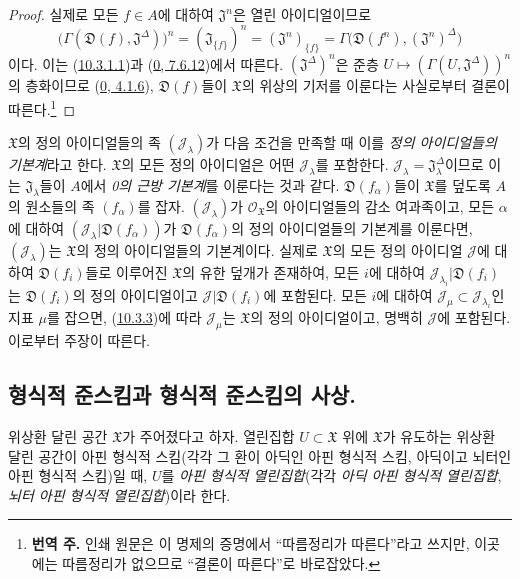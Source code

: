 \begin{proof}
실제로 모든 $f\in A$에 대하여 $\mathfrak{J}^n$은 열린 아이디얼이므로
\[
  \bigl(\Gamma(\mathfrak{D}(f),\mathfrak{J}^\Delta)\bigr)^n
  =(\mathfrak{J}_{\{f\}})^n
  =(\mathfrak{J}^n)_{\{f\}}
  =\Gamma\bigl(\mathfrak{D}(f^n),(\mathfrak{J}^n)^\Delta\bigr)
\]
이다. 이는 (\hyperref[I.10.3.1.1-ko]{10.3.1.1})과
(\hyperref[0.7.6.12-ko]{0, 7.6.12})에서 따른다.
$(\mathfrak{J}^\Delta)^n$은 준층
$U\mapsto(\Gamma(U,\mathfrak{J}^\Delta))^n$의 층화이므로
(\hyperref[0.4.1.6-ko]{0, 4.1.6}), $\mathfrak{D}(f)$들이
$\mathfrak{X}$의 위상의 기저를 이룬다는 사실로부터 결론이
따른다.\footnote{\textbf{번역 주.} 인쇄 원문은 이 명제의 증명에서
“따름정리가 따른다”라고 쓰지만, 이곳에는 따름정리가 없으므로 “결론이
따른다”로 바로잡았다.}
\end{proof}

\begin{env}[10.3.7]
\label{I.10.3.7-ko}
$\mathfrak{X}$의 정의 아이디얼들의 족 $(\mathscr{J}_\lambda)$가 다음
조건을 만족할 때 이를 \emph{정의 아이디얼들의 기본계}라고 한다.
$\mathfrak{X}$의 모든 정의 아이디얼은 어떤 $\mathscr{J}_\lambda$를
포함한다. $\mathscr{J}_\lambda=\mathfrak{J}_\lambda^\Delta$이므로 이는
$\mathfrak{J}_\lambda$들이 $A$에서 \emph{0의 근방 기본계}를 이룬다는
것과 같다. $\mathfrak{D}(f_\alpha)$들이 $\mathfrak{X}$를 덮도록
$A$의 원소들의 족 $(f_\alpha)$를 잡자.
$(\mathscr{J}_\lambda)$가 $\mathscr{O}_{\mathfrak{X}}$의 아이디얼들의
감소 여과족이고, 모든 $\alpha$에 대하여
$(\mathscr{J}_\lambda|\mathfrak{D}(f_\alpha))$가
$\mathfrak{D}(f_\alpha)$의 정의 아이디얼들의 기본계를 이룬다면,
$(\mathscr{J}_\lambda)$는 $\mathfrak{X}$의 정의 아이디얼들의 기본계이다.
실제로 $\mathfrak{X}$의 모든 정의 아이디얼 $\mathscr{J}$에 대하여
$\mathfrak{D}(f_i)$들로 이루어진 $\mathfrak{X}$의 유한 덮개가 존재하여,
모든 $i$에 대하여
$\mathscr{J}_{\lambda_i}|\mathfrak{D}(f_i)$는
$\mathfrak{D}(f_i)$의 정의 아이디얼이고
$\mathscr{J}|\mathfrak{D}(f_i)$에 포함된다. 모든 $i$에 대하여
$\mathscr{J}_\mu\subset\mathscr{J}_{\lambda_i}$인 지표 $\mu$를 잡으면,
(\hyperref[I.10.3.3-ko]{10.3.3})에 따라 $\mathscr{J}_\mu$는
$\mathfrak{X}$의 정의 아이디얼이고, 명백히 $\mathscr{J}$에 포함된다.
이로부터 주장이 따른다.
\end{env}

\subsection{형식적 준스킴과 형식적 준스킴의 사상.}
\label{subsection:I.10.4-ko}

\begin{env}[10.4.1]
\label{I.10.4.1-ko}
위상환 달린 공간 $\mathfrak{X}$가 주어졌다고 하자. 열린집합
$U\subset\mathfrak{X}$ 위에 $\mathfrak{X}$가 유도하는 위상환 달린 공간이
아핀 형식적 스킴(각각 그 환이 아딕인 아핀 형식적 스킴, 아딕이고 뇌터인
아핀 형식적 스킴)일 때, $U$를 \emph{아핀 형식적 열린집합}(각각
\emph{아딕 아핀 형식적 열린집합}, \emph{뇌터 아핀 형식적 열린집합})이라
한다.
\end{env}

